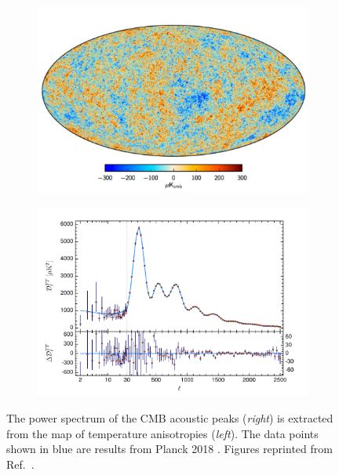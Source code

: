 \begin{figure}[!ht]
     \centering
     \begin{subfigure}{0.49\textwidth}
         \centering
         \includegraphics[width=\textwidth]{figures/DMOverview/CMBImg.png}
         \caption{}
         \label{fig:DMOverview/CMBImg}
     \end{subfigure}
     \hfill
     \begin{subfigure}{0.49\textwidth}
         \centering
         \includegraphics[width=\textwidth]{figures/DMOverview/coadded_TT.pdf}
         \caption{}
         \label{fig:DMOverview/CMBPowerSpec}
     \end{subfigure}
     \caption[The power spectrum of the CMB acoustic peaks is extracted from the map of temperature anisotropies.]{The power spectrum of the CMB acoustic peaks (\textit{right}) is extracted from the map of temperature anisotropies (\textit{left}). The data points shown in blue are results from Planck 2018 \cite{Planck:2018vyg}. Figures reprinted from Ref.~\cite{Cirelli:2024ssz,Planck:2018vyg}.}
     \label{fig:DMOverview/CMB}
\end{figure}

